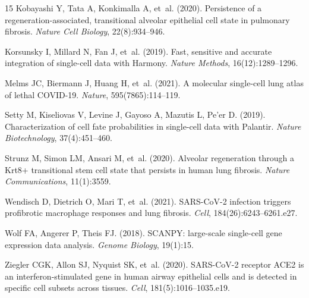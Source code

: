 \documentclass[11pt,a4paper]{article}
\begin{document}
\begin{thebibliography}{15}
Kobayashi Y, Tata A, Konkimalla A, et~al. (2020).
\newblock Persistence of a regeneration-associated, transitional alveolar epithelial cell state in pulmonary fibrosis.
\newblock \textit{Nature Cell Biology}, 22(8):934--946.

Korsunsky I, Millard N, Fan J, et~al. (2019).
\newblock Fast, sensitive and accurate integration of single-cell data with Harmony.
\newblock \textit{Nature Methods}, 16(12):1289--1296.

Melms JC, Biermann J, Huang H, et~al. (2021).
\newblock A molecular single-cell lung atlas of lethal COVID-19.
\newblock \textit{Nature}, 595(7865):114--119.

Setty M, Kiseliovas V, Levine J, Gayoso A, Mazutis L, Pe'er D. (2019).
\newblock Characterization of cell fate probabilities in single-cell data with Palantir.
\newblock \textit{Nature Biotechnology}, 37(4):451--460.

Strunz M, Simon LM, Ansari M, et~al. (2020).
\newblock Alveolar regeneration through a Krt8+ transitional stem cell state that persists in human lung fibrosis.
\newblock \textit{Nature Communications}, 11(1):3559.

Wendisch D, Dietrich O, Mari T, et~al. (2021).
\newblock SARS-CoV-2 infection triggers profibrotic macrophage responses and lung fibrosis.
\newblock \textit{Cell}, 184(26):6243--6261.e27.

Wolf FA, Angerer P, Theis FJ. (2018).
\newblock SCANPY: large-scale single-cell gene expression data analysis.
\newblock \textit{Genome Biology}, 19(1):15.

Ziegler CGK, Allon SJ, Nyquist SK, et~al. (2020).
\newblock SARS-CoV-2 receptor ACE2 is an interferon-stimulated gene in human airway epithelial cells and is detected in specific cell subsets across tissues.
\newblock \textit{Cell}, 181(5):1016--1035.e19.

\end{thebibliography}
\end{document}
